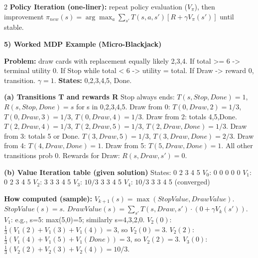 \documentclass[10pt]{article}
\begin{document}
\begin{multicols*}{2}
\textbf{Policy Iteration (one-liner):} repeat policy evaluation ($V_{\pi}$), then improvement
$\pi_{new}(s)=\arg\max_a \sum_{s'} T(s,a,s') [R + \gamma V_{\pi}(s')]$ until stable.

\textbf{5) Worked MDP Example (Micro-Blackjack)}

\textbf{Problem:} draw cards with replacement equally likely {2,3,4}. If total >= 6 -> terminal utility 0. If Stop while total < 6 -> utility = total. If Draw -> reward 0, transition. $\gamma=1$.\newline
\textbf{States:} {0,2,3,4,5, Done}.

\textbf{(a) Transitions T and rewards R}\newline
Stop always ends: $T(s,Stop,Done)=1$, $R(s,Stop,Done)=s$ for s in {0,2,3,4,5}.\newline
Draw from 0: $T(0,Draw,2)=1/3$, $T(0,Draw,3)=1/3$, $T(0,Draw,4)=1/3$.\newline
Draw from 2: totals 4,5,Done. $T(2,Draw,4)=1/3$, $T(2,Draw,5)=1/3$, $T(2,Draw,Done)=1/3$.\newline
Draw from 3: totals 5 or Done. $T(3,Draw,5)=1/3$, $T(3,Draw,Done)=2/3$.\newline
Draw from 4: $T(4,Draw,Done)=1$.\newline
Draw from 5: $T(5,Draw,Done)=1$.\newline
All other transitions prob 0. Rewards for Draw: $R(s,Draw,s')=0$.

\textbf{(b) Value Iteration table (given solution)}\newline
States: 0 2 3 4 5\newline
$V_0$: 0 0 0 0 0\newline
$V_1$: 0 2 3 4 5\newline
$V_2$: 3 3 3 4 5\newline
$V_3$: $10/3$ 3 3 4 5\newline
$V_4$: $10/3$ 3 3 4 5 (converged)

\textbf{How computed (sample):} $V_{k+1}(s)=\max(StopValue, DrawValue)$.\newline
$StopValue(s)=s$. $DrawValue(s)=\sum_{s'} T(s,Draw,s') \cdot (0+\gamma V_k(s'))$.\newline
$V_1$: e.g., s=5: max(5,0)=5; similarly s=4,3,2,0.\newline
$V_2(0)$: $\frac{1}{3}(V_1(2)+V_1(3)+V_1(4))=3$, so $V_2(0)=3$.\newline
$V_2(2)$: $\frac{1}{3}(V_1(4)+V_1(5)+V_1(Done))=3$, so $V_2(2)=3$.\newline
$V_3(0)$: $\frac{1}{3}(V_2(2)+V_2(3)+V_2(4))=10/3$.


\end{multicols*}
\end{document}
